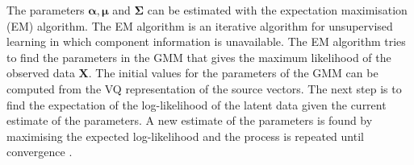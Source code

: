 The parameters $\boldsymbol{\alpha}, \boldsymbol{\mu}$ and $ \mathbf{\Sigma}$ can be estimated with the expectation maximisation (EM) algorithm. The EM algorithm is an iterative algorithm for unsupervised learning in which component information is unavailable. The EM algorithm tries to find the parameters in the GMM that gives the maximum likelihood of the observed data $\mathbf{X}$. The initial values for the parameters of the GMM can be computed from the VQ representation of the source vectors. The next step is to find the expectation of the log-likelihood of the latent data given the current estimate of the parameters. A new estimate of the parameters is found by maximising the expected log-likelihood and the process is repeated until convergence \cite{taletek}.


% 
% 
% 


